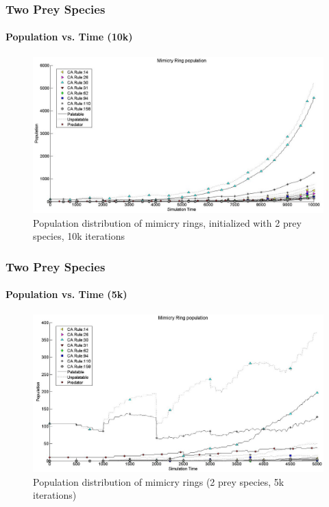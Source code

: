 \frame
{
	\frametitle{Two Prey Species}
	\framesubtitle{Population vs. Time (10k)}
	
	\begin{figure}
		\centering
		\includegraphics[scale=0.25]{../tex/images/simTime10k-2Prey}
		\caption{Population distribution of mimicry rings, initialized with 2 prey species, 10k iterations}
		\label{fig:plot-2-prey}
	\end{figure}
}

\frame
{
	\frametitle{Two Prey Species}
	\framesubtitle{Population vs. Time (5k)}
	
	\begin{figure}
		\centering
		\includegraphics[scale=0.25]{../tex/images/simTime5k-2Prey}
		\caption{Population distribution of mimicry rings (2 prey species, 5k iterations)}
		\label{fig:plot-2-prey-5k}
	\end{figure}
}

